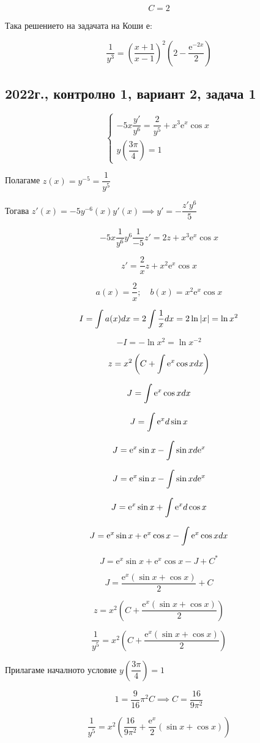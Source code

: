 \documentclass{scrartcl}
\begin{document}
$$C=2$$

Така решението на задачата на Коши е:

$$\dfrac{1}{y^3} = \left(\dfrac{x+1}{x-1}\right)^2\left(2-\dfrac{\mathrm{e}^{-2x}}{2}\right)$$

\subsection{2022г., контролно 1, вариант 2, задача 1}

$$
\begin{cases}
-5x\dfrac{y'}{y^6} = \dfrac{2}{y^5} + x^3\mathrm{e}^x\cos{x} \\
y\left(\dfrac{3\pi}{4}\right) = 1
\end{cases}
$$

Полагаме $z(x) = y^{-5} = \dfrac{1}{y^5}$

Тогава $z'(x) = -5y^{-6}(x)y'(x) \implies y' = -\dfrac{z'y^6}{5}$

$$-5x\dfrac{1}{y^6}y^6\dfrac{1}{-5}z'=2z+x^3\mathrm{e}^x\cos{x}$$

$$z'=\dfrac{2}{x}z+x^2\mathrm{e}^x\cos{x}$$

$$a(x) = \dfrac{2}{x};\quad b(x) = x^2\mathrm{e}^x\cos{x}$$

$$\displaystyle I=\int a(x)\space dx = 2\int\dfrac{1}{x}\space dx = 2\ln{|x|} = \ln{x^2}$$

$$-I = -\ln{x^2} = \ln{x^{-2}}$$

$$z = x^2\left(C+\int\mathrm{e}^x\cos{x}\space dx\right)$$

$$J = \displaystyle\int \mathrm{e}^x\cos{x} \space dx$$

$$J = \displaystyle\int \mathrm{e}^x \space d\sin{x}$$

$$J = \mathrm{e}^{x}\sin{x} - \displaystyle\int \sin{x} \space d\mathrm{e}^x$$

$$J = \mathrm{e}^{x}\sin{x} - \displaystyle\int \sin{x} \space d\mathrm{e}^x$$

$$J = \mathrm{e}^{x}\sin{x} + \displaystyle\int \mathrm{e}^x \space d\cos{x}$$

$$J = \mathrm{e}^{x}\sin{x} + \mathrm{e}^{x}\cos{x} - \displaystyle\int \mathrm{e}^x\cos{x} \space dx$$

$$J = \mathrm{e}^{x}\sin{x} + \mathrm{e}^{x}\cos{x} - J + C^*$$

$$J = \dfrac{\mathrm{e}^x(\sin{x} + \cos{x})}{2} + C$$

$$z = x^2\left(C+\dfrac{\mathrm{e}^x(\sin{x} + \cos{x})}{2}\right)$$

$$\dfrac{1}{y^5} = x^2\left(C+\dfrac{\mathrm{e}^x(\sin{x} + \cos{x})}{2}\right)$$

Прилагаме началното условие $y\left(\dfrac{3\pi}{4}\right) = 1$

$$1=\dfrac{9}{16}\pi^2C \implies C=\dfrac{16}{9\pi^2}$$

$$\dfrac{1}{y^5} = x^2\left(\dfrac{16}{9\pi^2}+\dfrac{\mathrm{e}^x}{2}(\sin{x}+\cos{x})\right)$$
\end{document}
